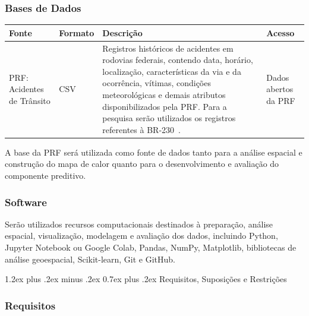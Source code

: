 \documentclass[11pt,a4paper]{article}
\makeatletter
\renewcommand\subsection{
\@startsection{subsection}{2}{0pt}%
{1.2ex plus .2ex minus .2ex}%
{0.7ex plus .2ex}%
{\normalfont\large\bfseries}
}
\makeatother
\begin{document}
\subsubsection*{Bases de Dados}

\begin{center}
\renewcommand{\arraystretch}{1.3}
\begin{tabularx}{\textwidth}{|p{3cm}|p{2cm}|X|p{3cm}|}
\hline
\textbf{Fonte} & \textbf{Formato} & \textbf{Descrição} & \textbf{Acesso} \\
\hline

PRF: Acidentes de Trânsito
& CSV
& Registros históricos de acidentes em rodovias federais, contendo data, horário, localização, características da via e da ocorrência, vítimas, condições meteorológicas e demais atributos disponibilizados pela PRF. Para a pesquisa serão utilizados os registros referentes à BR-230~\cite{prfdados}.
& Dados abertos da PRF \\

\hline
\end{tabularx}
\end{center}

A base da PRF será utilizada como fonte de dados tanto para a análise espacial e construção do mapa de calor quanto para o desenvolvimento e avaliação do componente preditivo.

\subsubsection*{Software}

Serão utilizados recursos computacionais destinados à preparação, análise espacial, visualização, modelagem e avaliação dos dados, incluindo Python, Jupyter Notebook ou Google Colab, Pandas, NumPy, Matplotlib, bibliotecas de análise geoespacial, Scikit-learn, Git e GitHub.


\subsection{Requisitos, Suposições e Restrições}

\subsubsection*{Requisitos}
\end{document}
